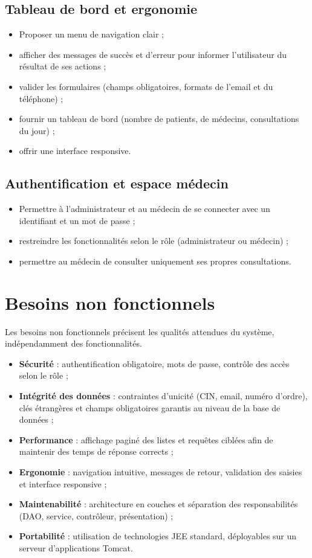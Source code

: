 \subsection{Tableau de bord et ergonomie}

\begin{itemize}
    \item Proposer un menu de navigation clair ;
    \item afficher des messages de succès et d'erreur pour informer l'utilisateur du résultat de ses actions ;
    \item valider les formulaires (champs obligatoires, formats de l'email et du téléphone) ;
    \item fournir un tableau de bord (nombre de patients, de médecins, consultations du jour) ;
    \item offrir une interface responsive.
\end{itemize}

\subsection{Authentification et espace médecin}

\begin{itemize}
    \item Permettre à l'administrateur et au médecin de se connecter avec un identifiant et un mot de passe ;
    \item restreindre les fonctionnalités selon le rôle (administrateur ou médecin) ;
    \item permettre au médecin de consulter uniquement ses propres consultations.
\end{itemize}

\section{Besoins non fonctionnels}

Les besoins non fonctionnels précisent les qualités attendues du système, indépendamment des fonctionnalités.

\begin{itemize}
    \item \textbf{Sécurité} : authentification obligatoire, mots de passe, contrôle des accès selon le rôle ;
    \item \textbf{Intégrité des données} : contraintes d'unicité (CIN, email, numéro d'ordre), clés étrangères et champs obligatoires garantis au niveau de la base de données ;
    \item \textbf{Performance} : affichage paginé des listes et requêtes ciblées afin de maintenir des temps de réponse corrects ;
    \item \textbf{Ergonomie} : navigation intuitive, messages de retour, validation des saisies et interface responsive ;
    \item \textbf{Maintenabilité} : architecture en couches et séparation des responsabilités (DAO, service, contrôleur, présentation) ;
    \item \textbf{Portabilité} : utilisation de technologies JEE standard, déployables sur un serveur d'applications Tomcat.
\end{itemize}

